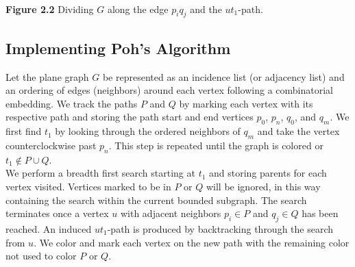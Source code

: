 \documentclass[11pt,letter]{article}
\begin{document}
\begin{center}
\hfill\\
\textbf{Figure 2.2} Dividing $G$ along the edge $p_iq_j$ and the $ut_1$-path.
\end{center}

\subsection*{Implementing Poh's Algorithm}

Let the plane graph $G$ be represented as an incidence list (or adjacency list) and an ordering of edges (neighbors) around
each vertex following a
combinatorial embedding. We track the paths $P$ and $Q$ by marking each vertex with its respective path and
storing the path start and end vertices $p_0$, $p_n$, $q_0$, and $q_m$.
We first find $t_1$ by looking through the ordered neighbors of $q_m$ and take the vertex counterclockwise past
$p_n$. This step is repeated until the graph is colored or $t_1\not\in P\cup Q$.\\

\noindent We perform a
breadth first search starting at $t_1$ and storing parents for each vertex visited. Vertices marked to be in $P$
or $Q$ will be ignored, in this way containing the search within the current bounded subgraph. The
search terminates once a vertex $u$ with adjacent neighbors $p_i\in P$ and $q_j\in Q$ has been reached. An
induced $ut_1$-path is produced by backtracking through the search from $u$. We color and mark each vertex on the
new path with the remaining color not used to color $P$ or $Q$.\\
\end{document}
